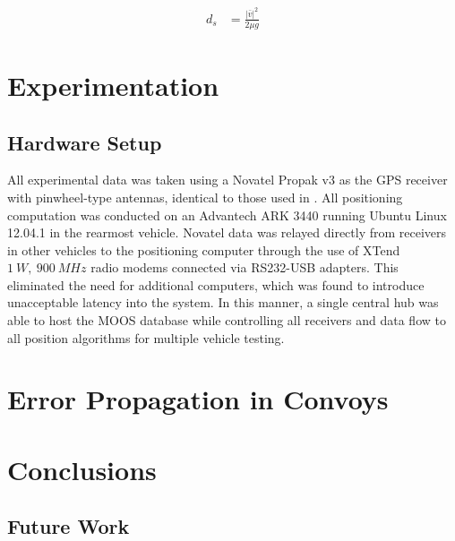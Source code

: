 \documentclass[12pt]{report}
\begin{document}
\begin{align}
    \label{eq:stopdist}
    d_s &= \frac {|\bar{v}|^2} {2 \mu g}
\end{align}


\chapter{Experimentation}
\label{chap:exper}

\section{Hardware Setup}
\label{sec:hardware}
All experimental data was taken using a Novatel Propak v3 as the GPS receiver with pinwheel-type antennas, identical to those used in \cite{scottthesis}. All positioning computation was conducted on an Advantech ARK 3440 running Ubuntu Linux 12.04.1 in the rearmost vehicle. Novatel data was relayed directly from receivers in other vehicles to the positioning computer through the use of XTend $1~W,~900~MHz$ radio modems connected via RS232-USB adapters. This eliminated the need for additional computers, which was found to introduce unacceptable latency into the system. In this manner, a single central hub was able to host the MOOS database while controlling all receivers and data flow to all position algorithms for multiple vehicle testing.

\chapter{Error Propagation in Convoys}
\label{chap:errprop}


\chapter{Conclusions}


\section{Future Work}






\nocite{travisdiss}
\nocite{travisshort}
\nocite{calgary}

\end{document}
